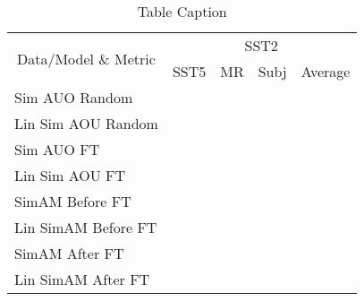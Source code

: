 \begin{table}[htbp]
    \centering
    \caption{Table Caption}
    \label{tab:mytable}
    \begin{tabular}{|l|cccc|}
    \hline
    \multicolumn{1}{|c|}{\multirow{2}{*}{Data/Model \& Metric}} & \multicolumn{4}{c|}{SST2} \\ \cline{2-5} 
    \multicolumn{1}{|c|}{} & SST5 & MR & Subj & Average \\ \hline
    Sim AUO Random & & & & \\
    Lin Sim AOU Random & & & & \\
    Sim AUO FT & & & & \\
    Lin Sim AOU FT & & & & \\
    SimAM Before FT & & & & \\
    Lin SimAM Before FT & & & & \\
    SimAM After FT & & & & \\
    Lin SimAM After FT & & & & \\ \hline
    \end{tabular}
    \end{table}